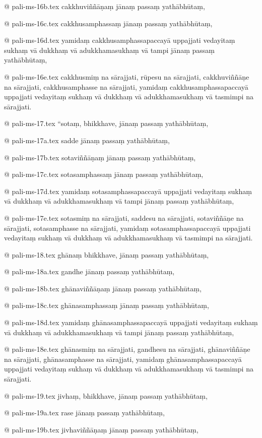 @ pali-ms-16b.tex
cakkhuviññāṇaṃ jānaṃ passaṃ yathābhūtaṃ,

@ pali-ms-16c.tex
cakkhusamphassaṃ jānaṃ passaṃ yathābhūtaṃ,

@ pali-ms-16d.tex
yamidaṃ cakkhusamphassapaccayā uppajjati vedayitaṃ sukhaṃ vā dukkhaṃ vā adukkhamasukhaṃ vā tampi jānaṃ passaṃ yathābhūtaṃ,

@ pali-ms-16e.tex
cakkhusmiṃ na sārajjati, rūpesu na sārajjati, cakkhuviññāṇe na sārajjati, cakkhusamphasse na sārajjati, yamidaṃ cakkhusamphassapaccayā uppajjati vedayitaṃ sukhaṃ vā dukkhaṃ vā adukkhamasukhaṃ vā tasmimpi na sārajjati.

@ pali-ms-17.tex
“sotaṃ, bhikkhave, jānaṃ passaṃ yathābhūtaṃ,

@ pali-ms-17a.tex
sadde jānaṃ passaṃ yathābhūtaṃ,

@ pali-ms-17b.tex
sotaviññāṇaṃ jānaṃ passaṃ yathābhūtaṃ,

@ pali-ms-17c.tex
sotasamphassaṃ jānaṃ passaṃ yathābhūtaṃ,

@ pali-ms-17d.tex
yamidaṃ sotasamphassapaccayā uppajjati vedayitaṃ sukhaṃ vā dukkhaṃ vā adukkhamasukhaṃ vā tampi jānaṃ passaṃ yathābhūtaṃ,

@ pali-ms-17e.tex
sotasmiṃ na sārajjati, saddesu na sārajjati, sotaviññāṇe na sārajjati, sotasamphasse na sārajjati, yamidaṃ sotasamphassapaccayā uppajjati vedayitaṃ sukhaṃ vā dukkhaṃ vā adukkhamasukhaṃ vā tasmimpi na sārajjati.

@ pali-ms-18.tex
ghānaṃ bhikkhave, jānaṃ passaṃ yathābhūtaṃ,

@ pali-ms-18a.tex
gandhe jānaṃ passaṃ yathābhūtaṃ,

@ pali-ms-18b.tex
ghānaviññāṇaṃ jānaṃ passaṃ yathābhūtaṃ,

@ pali-ms-18c.tex
ghānasamphassaṃ jānaṃ passaṃ yathābhūtaṃ,

@ pali-ms-18d.tex
yamidaṃ ghānasamphassapaccayā uppajjati vedayitaṃ sukhaṃ vā dukkhaṃ vā adukkhamasukhaṃ vā tampi jānaṃ passaṃ yathābhūtaṃ,

@ pali-ms-18e.tex
ghānasmiṃ na sārajjati, gandhesu na sārajjati, ghānaviññāṇe na sārajjati, ghānasamphasse na sārajjati, yamidaṃ ghānasamphassapaccayā uppajjati vedayitaṃ sukhaṃ vā dukkhaṃ vā adukkhamasukhaṃ vā tasmimpi na sārajjati.

@ pali-ms-19.tex
jivhaṃ, bhikkhave, jānaṃ passaṃ yathābhūtaṃ,

@ pali-ms-19a.tex
rase jānaṃ passaṃ yathābhūtaṃ,

@ pali-ms-19b.tex
jivhaviññāṇaṃ jānaṃ passaṃ yathābhūtaṃ,

